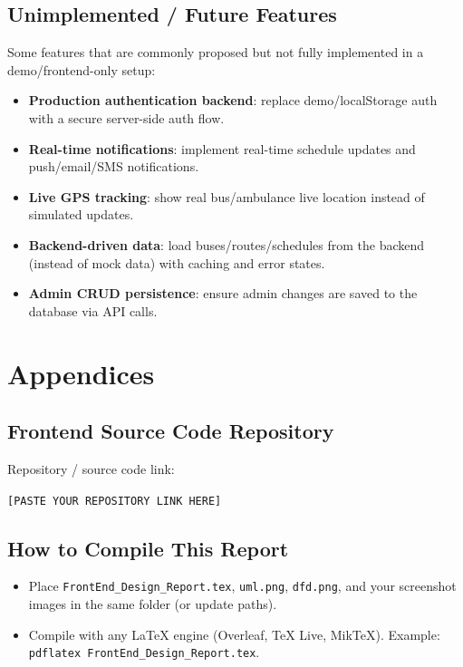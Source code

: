 \documentclass[12pt,a4paper]{report}
\newcommand{\RepoLink}{\texttt{[PASTE YOUR REPOSITORY LINK HERE]}}
\begin{document}
\section{Unimplemented / Future Features}
Some features that are commonly proposed but not fully implemented in a demo/frontend-only setup:
\begin{itemize}[leftmargin=1.2cm]
  \item \textbf{Production authentication backend}: replace demo/localStorage auth with a secure server-side auth flow.
  \item \textbf{Real-time notifications}: implement real-time schedule updates and push/email/SMS notifications.
  \item \textbf{Live GPS tracking}: show real bus/ambulance live location instead of simulated updates.
  \item \textbf{Backend-driven data}: load buses/routes/schedules from the backend (instead of mock data) with caching and error states.
  \item \textbf{Admin CRUD persistence}: ensure admin changes are saved to the database via API calls.
\end{itemize}

\appendix
\chapter{Appendices}

\section{Frontend Source Code Repository}
Repository / source code link:

\begin{center}
  \RepoLink
\end{center}

\section{How to Compile This Report}
\begin{itemize}[leftmargin=1.2cm]
  \item Place \texttt{FrontEnd\_Design\_Report.tex}, \texttt{uml.png}, \texttt{dfd.png}, and your screenshot images in the same folder (or update paths).
  \item Compile with any LaTeX engine (Overleaf, TeX Live, MikTeX). Example: \texttt{pdflatex FrontEnd\_Design\_Report.tex}.
\end{itemize}
\end{document}
